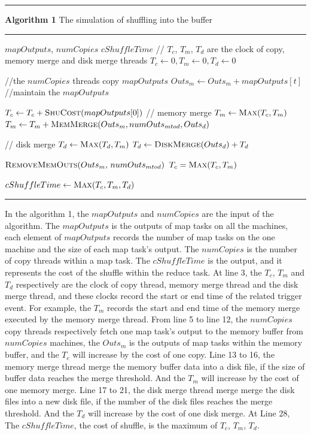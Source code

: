 \noindent\rule{3.5in}{0.6mm}
\textbf{Algorithm 1} The simulation of shuffling into the buffer
\rule{3.5in}{0.3mm}
\begin{algorithmic}[1]
\Require $mapOutputs$, $numCopies$
\Ensure $cShuffleTime$
\State // $T_c$, $T_m$, $T_d$ are the clock of copy, memory merge and disk merge threads
\State $T_c \gets 0, T_m \gets 0, T_d \gets 0$


\State //the $numCopies$ threads copy $mapOutputs$
\State $Outs_m \gets Outs_m + mapOutputs[t]$
\State //maintain the $mapOutputs$ 
\EndIf
\EndFor

\State $T_c \gets T_c + \Call{ShuCost}{mapOutputs[0]}$
\State // memory merge
\State $T_m \gets \Call{Max}{T_c, T_m}$
\State $T_m \gets T_m + \Call{MemMerge}{Outs_m, numOuts_{mtod},Outs_d}$

\State // disk merge
\State $T_d \gets \Call{Max}{T_d, T_m}$
\State $T_d \gets \Call{DiskMerge}{Outs_d} + T_d$
\EndIf
\EndIf

\State $\Call{RemoveMemOuts}{Outs_m, $
$numOuts_{mtod}}$
\State $T_c = \Call{Max}{T_c, T_m}$
\EndIf

\EndWhile
\State $cShuffleTime \gets \Call{Max}{T_c, T_m, T_d}$
\EndFunction
\end{algorithmic}
\noindent\rule{3.5in}{0.6mm}

In the algorithm 1, the $mapOutputs$ and $numCopies$ are the input of the algorithm. The $mapOutputs$ is the outputs of map tasks on all the machines,  each element of $mapOutputs$ records the number of map tasks on the one machine and the size of each map task's output. The $numCopies$ is the number of copy threads within a map task. The $cShuffleTime$ is the output, and it represents the cost of the shuffle within the reduce task. At line 3, the $T_c$, $T_m$ and $T_d$ respectively are the clock of copy thread, memory merge thread and the disk merge thread, and these clocks record the start or end time of the related trigger event. For example, the $T_m$ records the start and end time of the memory merge executed by the memory merge thread. From line 5 to line 12,  the $numCopies$ copy threads respectively fetch one map task's output to the memory buffer from $numCopies$ machines, the $Outs_m$ is the outputs of map tasks within the memory buffer, and the $T_c$ will increase by the cost of one copy.  Line 13 to 16, the memory merge thread merge the memory buffer data into a disk file, if the size of buffer data reaches the merge threshold. And the $T_m$ will increase by the cost of one memory merge. Line 17 to 21, the disk merge thread merge merge the disk files into a new disk file, if the number of the disk files reaches the merge threshold. And the $T_d$ will increase by the cost of one disk merge. At Line 28, The $cShuffleTime$, the cost of shuffle, is the maximum of $T_c$, $T_m$, $T_d$.

